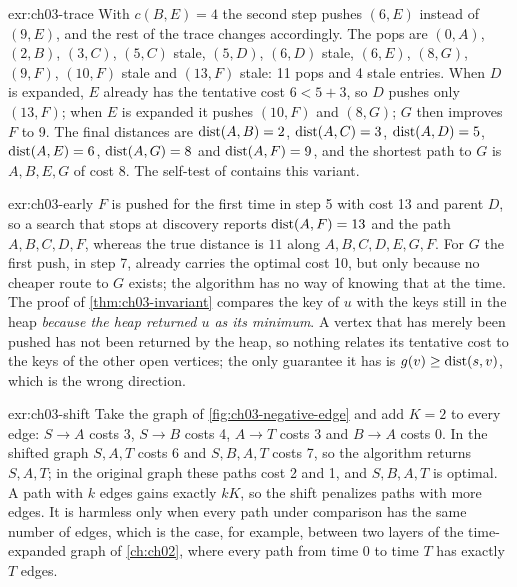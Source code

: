
\begin{solution}{exr:ch03-trace}
With $c(B,E)=4$ the second step pushes $(6,E)$ instead of $(9,E)$, and the rest of the trace changes accordingly. The pops are $(0,A)$, $(2,B)$, $(3,C)$, $(5,C)$ stale, $(5,D)$, $(6,D)$ stale, $(6,E)$, $(8,G)$, $(9,F)$, $(10,F)$ stale and $(13,F)$ stale: 11 pops and 4 stale entries. When $D$ is expanded, $E$ already has the tentative cost $6<5+3$, so $D$ pushes only $(13,F)$; when $E$ is expanded it pushes $(10,F)$ and $(8,G)$; $G$ then improves $F$ to 9. The final distances are $\operatorname{dist}(A,B)=2$, $\operatorname{dist}(A,C)=3$, $\operatorname{dist}(A,D)=5$, $\operatorname{dist}(A,E)=6$, $\operatorname{dist}(A,G)=8$ and $\operatorname{dist}(A,F)=9$, and the shortest path to $G$ is $A,B,E,G$ of cost 8. The self-test of  contains this variant.
\end{solution}

\begin{solution}{exr:ch03-early}
$F$ is pushed for the first time in step 5 with cost 13 and parent $D$, so a search that stops at discovery reports $\operatorname{dist}(A,F)=13$ and the path $A,B,C,D,F$, whereas the true distance is $11$ along $A,B,C,D,E,G,F$. For $G$ the first push, in step 7, already carries the optimal cost 10, but only because no cheaper route to $G$ exists; the algorithm has no way of knowing that at the time. The proof of \cref{thm:ch03-invariant} compares the key of $u$ with the keys still in the heap \emph{because the heap returned $u$ as its minimum}. A vertex that has merely been pushed has not been returned by the heap, so nothing relates its tentative cost to the keys of the other open vertices; the only guarantee it has is $g(v)\ge\operatorname{dist}(s,v)$, which is the wrong direction.
\end{solution}

\begin{solution}{exr:ch03-shift}
Take the graph of \cref{fig:ch03-negative-edge} and add $K=2$ to every edge: $S\to A$ costs 3, $S\to B$ costs 4, $A\to T$ costs 3 and $B\to A$ costs 0. In the shifted graph $S,A,T$ costs 6 and $S,B,A,T$ costs 7, so the algorithm returns $S,A,T$; in the original graph these paths cost 2 and 1, and $S,B,A,T$ is optimal. A path with $k$ edges gains exactly $kK$, so the shift penalizes paths with more edges. It is harmless only when every path under comparison has the same number of edges, which is the case, for example, between two layers of the time-expanded graph of \cref{ch:ch02}, where every path from time 0 to time $T$ has exactly $T$ edges.
\end{solution}

